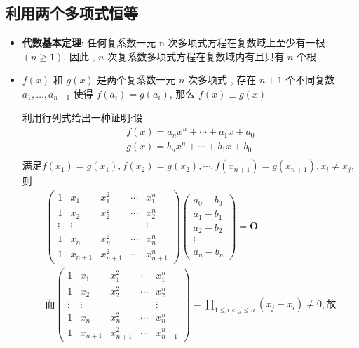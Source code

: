 \documentclass{article}
\begin{document}
		\subsection{利用两个多项式恒等}
			\begin{itemize}
				\item\textbf{代数基本定理}: 任何复系数一元 n 次多项式方程在复数域上至少有一根 $(n \geq 1)$, 因此 , $n$ 次复系数多项式方程在复数域内有且只有 $n$ 个根
				\item$f(x)$ 和 $g(x)$ 是两个复系数一元 $n$ 次多项式 , 存在 $n+1$ 个不同复数 $a_{1}, \ldots, a_{n+1}$ 使得 $f\left(a_{i}\right)=g\left(a_{i}\right)$, 那么 $f(x) \equiv g(x)$

				利用行列式给出一种证明:设
				$$
				\begin{gathered}
					f(x)=a_{n}x^{n}+\cdots+a_{1}x+a_{0}\\
					g(x)=b_{n}x^{n}+\cdots+b_{1}x+b_{0}\\
				\end{gathered}
				$$
				满足$f(x_1)=g(x_1), f(x_2)=g(x_2), \cdots, f(x_{n+1})=g(x_{n+1}),x_i\neq x_j$,则
				$$
				\begin{gathered}
					\left(\begin{array}{ccccc}
						1 & x_{1} & x_{1}^2 &\cdots & x_{1}^n \\
						1 & x_{2} & x_{2}^2 & \cdots & x_{2}^n \\
						\vdots & \vdots & & & \vdots \\
						1 & x_{n} & x_{n}^2 & \cdots & x_{n}^n \\
						1 & x_{n+1} & x_{n+1}^2 & \cdots & x_{n+1}^n
					\end{array}\right)
					\left(\begin{array}{c}
						a_0-b_0\\a_1-b_1\\a_2-b_2\\ \vdots \\ a_n-b_n
					\end{array}\right)=\boldsymbol O\\
					\text{而}
					\left(\begin{array}{ccccc}
						1 & x_{1} & x_{1}^2 &\cdots & x_{1}^n \\
						1 & x_{2} & x_{2}^2 & \cdots & x_{2}^n \\
						\vdots & \vdots & & & \vdots \\
						1 & x_{n} & x_{n}^2 & \cdots & x_{n}^n \\
						1 & x_{n+1} & x_{n+1}^2 & \cdots & x_{n+1}^n
					\end{array}\right)=\prod_{1 \leqslant i<j \leqslant n}\left(x_{j}-x_{i}\right)\neq 0,\text{故}

\end{gathered}$$
\end{itemize}
\end{document}

